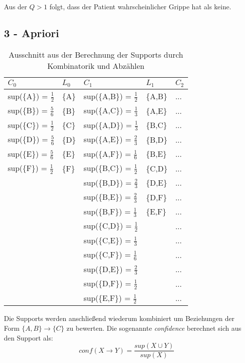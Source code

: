 Aus der $Q > 1$ folgt, dass der Patient wahrscheinlicher Grippe hat als keine.

\subsection*{3 - Apriori}
\def\arraystretch{1.5}%
\begin{table}[h]
\centering
\caption{Ausschnitt aus der Berechnung der Supports durch Kombinatorik und Abzählen}
\begin{tabular}{l | l | l | l | l}
$C_0$ & $L_0$ & $C_1$ & $L_1$ & $C_2$ \\ \hline
sup(\{A\}) = $\frac{1}{2}$ & \{A\} & sup(\{A,B\}) = $\frac{1}{2}$ & \{A,B\} & ... \\
sup(\{B\}) = $\frac{5}{6}$ & \{B\} & sup(\{A,C\}) = $\frac{1}{3}$ & \{A,E\} & ... \\
sup(\{C\}) = $\frac{1}{2}$ & \{C\} & sup(\{A,D\}) = $\frac{1}{3}$ & \{B,C\} & ... \\
sup(\{D\}) = $\frac{5}{6}$ & \{D\} & sup(\{A,E\}) = $\frac{2}{3}$ & \{B,D\} & ... \\
sup(\{E\}) = $\frac{5}{6}$ & \{E\} & sup(\{A,F\}) = $\frac{1}{6}$ & \{B,E\} & ... \\
sup(\{F\}) = $\frac{1}{2}$ & \{F\} & sup(\{B,C\}) = $\frac{1}{2}$ & \{C,D\} & ... \\
& & sup(\{B,D\}) = $\frac{2}{3}$ & \{D,E\} & ... \\
& & sup(\{B,E\}) = $\frac{2}{3}$ & \{D,F\} & ... \\
& & sup(\{B,F\}) = $\frac{1}{3}$ & \{E,F\} & ... \\
& & sup(\{C,D\}) = $\frac{1}{2}$ & & ... \\
& & sup(\{C,E\}) = $\frac{1}{3}$ & & ... \\
& & sup(\{C,F\}) = $\frac{1}{6}$ & & ... \\
& & sup(\{D,E\}) = $\frac{2}{3}$ & & ... \\
& & sup(\{D,F\}) = $\frac{1}{2}$ & & ... \\
& & sup(\{E,F\}) = $\frac{1}{2}$ & & ... \\
\end{tabular}
\end{table}

Die Supports werden anschließend wiederum kombiniert um Beziehungen der Form $\{A,B\} \rightarrow \{C\}$ zu bewerten. Die sogenannte \textit{confidence} berechnet sich aus den Support als:
\begin{equation}
conf(X \rightarrow Y) = \frac{sup(X \cup Y)}{sup(X)}
\end{equation}

